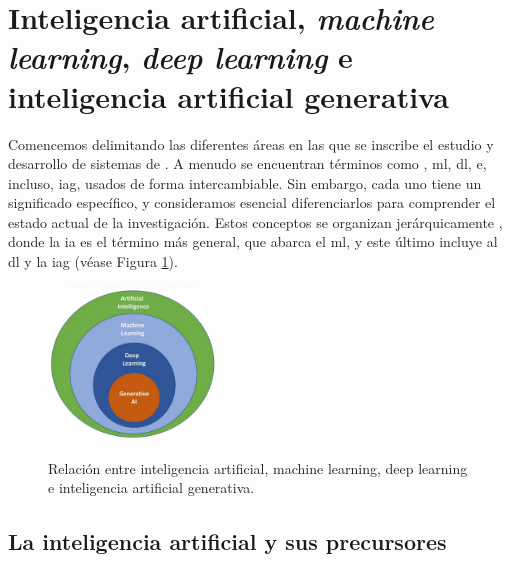 
\section{Inteligencia artificial, \emph{machine learning}, \emph{deep learning} e inteligencia artificial generativa}

Comencemos delimitando las diferentes áreas en las que se inscribe el estudio y desarrollo de sistemas de . A menudo se encuentran términos como , \gls{ml}, \gls{dl}, e, incluso, \gls{iag}, usados de forma intercambiable. Sin embargo, cada uno tiene un significado específico, y consideramos esencial diferenciarlos para comprender el estado actual de la investigación. Estos conceptos se organizan jerárquicamente \citep{torresivinalsPythonDeepLearning2020}, donde la \gls{ia} es el término más general, que abarca el \gls{ml}, y este último incluye al \gls{dl} y la \gls{iag} (véase Figura \ref{fig:ai_ml_dl_gai}).

\begin{figure}[H]
    \caption{Relación entre inteligencia artificial, {machine learning}, {deep learning} e inteligencia artificial generativa.}
    \centering
    \includegraphics[width=0.4\textwidth]{./figuras/ai_ml_dl_gai.png}
    \label{fig:ai_ml_dl_gai}
\end{figure}



\subsection{La inteligencia artificial y sus precursores}


